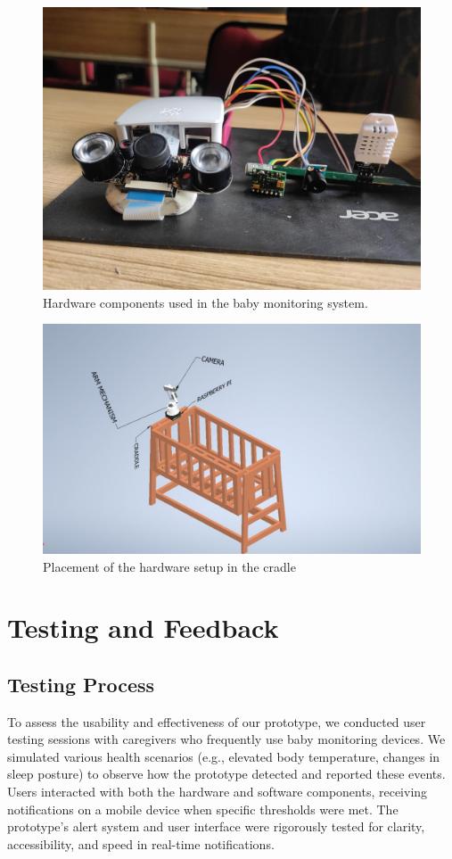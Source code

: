 \documentclass[12pt,a4paper]{report}
\begin{document}
\begin{figure}[H]
  \centering
  \includegraphics[scale=0.35]{./pic/hardware.jpeg}
  \caption{Hardware components used in the baby monitoring system.}
  \label{fig:hardware}
\end{figure}
\begin{figure}[H]
  \centering
  \includegraphics[scale=0.4]{./pic/cradle.jpeg}
  \caption{Placement of the hardware setup in the cradle}
  \label{fig:cradle}
\end{figure}


\chapter{Testing and Feedback}
\section{Testing Process}
To assess the usability and effectiveness of our prototype, we conducted user testing sessions with caregivers who frequently use baby monitoring devices. We simulated various health scenarios (e.g., elevated body temperature, changes in sleep posture) to observe how the prototype detected and reported these events. Users interacted with both the hardware and software components, receiving notifications on a mobile device when specific thresholds were met. The prototype’s alert system and user interface were rigorously tested for clarity, accessibility, and speed in real-time notifications.
\end{document}
